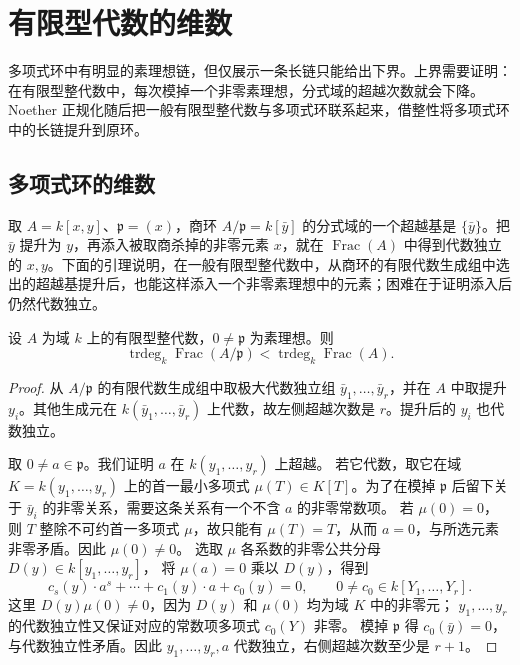 
\section{有限型代数的维数}
\label{b3:sec:0903}

多项式环中有明显的素理想链，但仅展示一条长链只能给出下界。上界需要证明：在有限型整代数中，每次模掉一个非零素理想，分式域的超越次数就会下降。Noether 正规化随后把一般有限型整代数与多项式环联系起来，借整性将多项式环中的长链提升到原环。


\subsection{多项式环的维数}
\label{b3:subsec:0903:01}

取 \(A=k[x,y]\)、\(\mathfrak p=(x)\)，商环 \(A/\mathfrak p=k[\bar y]\) 的分式域的一个超越基是 \(\{\bar y\}\)。把 \(\bar y\) 提升为 \(y\)，再添入被取商杀掉的非零元素 \(x\)，就在 \(\operatorname{Frac}(A)\) 中得到代数独立的 \(x,y\)。下面的引理说明，在一般有限型整代数中，从商环的有限代数生成组中选出的超越基提升后，也能这样添入一个非零素理想中的元素；困难在于证明添入后仍然代数独立。

\begin{lemma}\label{b3:lem:transcendence-degree-drop}
	设 \(A\) 为域 \(k\) 上的有限型整代数，\(0\ne\mathfrak p\) 为素理想。则
	\[
		\operatorname{trdeg}_k\operatorname{Frac}(A/\mathfrak p) <\operatorname{trdeg}_k\operatorname{Frac}(A).
	\]
\end{lemma}
\begin{proof}
	从 \(A/\mathfrak p\) 的有限代数生成组中取极大代数独立组 \(\bar y_1,\ldots,\bar y_r\)，并在 \(A\) 中取提升 \(y_i\)。其他生成元在 \(k(\bar y_1,\ldots,\bar y_r)\) 上代数，故左侧超越次数是 \(r\)。提升后的 \(y_i\) 也代数独立。

	取 \(0\ne a\in\mathfrak p\)。我们证明 \(a\) 在 \(k(y_1,\ldots,y_r)\) 上超越。 若它代数，取它在域 \(K=k(y_1,\ldots,y_r)\) 上的首一最小多项式 \(\mu(T)\in K[T]\)。为了在模掉 \(\mathfrak p\) 后留下关于 \(\bar y_i\) 的非零关系，需要这条关系有一个不含 \(a\) 的非零常数项。 若 \(\mu(0)=0\)，则 \(T\) 整除不可约首一多项式 \(\mu\)，故只能有 \(\mu(T)=T\)，从而 \(a=0\)，与所选元素非零矛盾。因此 \(\mu(0)\ne0\)。 选取 \(\mu\) 各系数的非零公共分母 \(D(y)\in k[y_1,\ldots,y_r]\)， 将 \(\mu(a)=0\) 乘以 \(D(y)\)，得到
	\[
		c_s(y)\cdot a^s+\cdots+c_1(y)\cdot a+c_0(y)=0, \qquad 0\ne c_0\in k[Y_1,\ldots,Y_r].
	\]
	这里 \(D(y)\mu(0)\ne0\)，因为 \(D(y)\) 和 \(\mu(0)\) 均为域 \(K\) 中的非零元； \(y_1,\ldots,y_r\) 的代数独立性又保证对应的常数项多项式 \(c_0(Y)\) 非零。 模掉 \(\mathfrak p\) 得 \(c_0(\bar y)=0\)，与代数独立性矛盾。因此 \(y_1,\ldots,y_r,a\) 代数独立，右侧超越次数至少是 \(r+1\)。
\end{proof}

